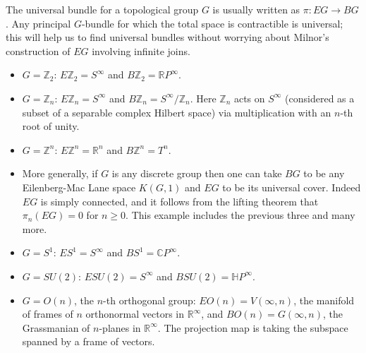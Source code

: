 \documentclass[12pt]{article}
\begin{document}
The universal bundle  for a topological group $G$ is usually written as $\pi:EG\to BG$.  Any principal $G$-bundle for which the total space is contractible 
is universal; this will help us to find universal bundles without worrying about Milnor's construction of $EG$ involving infinite joins.

\begin{itemize}

\item $G=\mathbb{Z}_2$: $E\mathbb{Z}_2=S^\infty$ and $B\mathbb{Z}_2=\mathbb{R}P^\infty$.

\item $G=\mathbb{Z}_n$: $E\mathbb{Z}_n=S^\infty$ and $B\mathbb{Z}_n=S^\infty/\mathbb{Z}_n$. Here $\mathbb{Z}_n$ acts on $S^\infty$ (considered as a subset of a separable complex Hilbert space) via multiplication with an $n$-th root of unity.

\item $G=\mathbb{Z}^n$: $E\mathbb{Z}^n=\mathbb{R}^n$ and $B\mathbb{Z}^n=T^n$.

\item More generally, if $G$ is any discrete group then one can take  $BG$ to be any Eilenberg-Mac Lane space $ K(G,1)$ and $EG$ to be its universal cover. Indeed $EG$ is simply connected, and it follows from the lifting theorem that $\pi_n(EG)=0$ for $n\geq 0$. This example includes the previous three and many more. 

\item $G=S^1$: $ES^1=S^\infty$ and $BS^1=\mathbb{C}P^\infty$.

\item $G=SU(2)$: $ESU(2)=S^\infty$ and $BSU(2)=\mathbb{H}P^\infty$.

\item $G=O(n)$, the $n$-th orthogonal group: $EO(n)=V(\infty,n)$, the manifold of frames
of $n$ orthonormal vectors in $\mathbb{R}^\infty$, and $BO(n)=G(\infty, n)$,  the
Grassmanian of $n$-planes in $\mathbb{R}^\infty$.  The projection map is
taking the subspace spanned by a frame of vectors.

\end{itemize}
\end{document}
